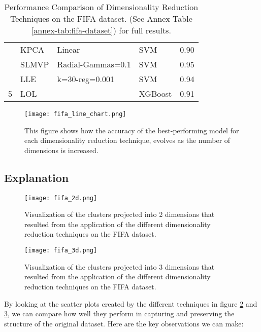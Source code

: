 \begin{table}[!ht]
\begin{tabular}{llllr}
        \rowcolor{lightgray}\multirow{-3}{*}{4} & KPCA           & Linear             & SVM           & 0.90     \\
                                                & SLMVP          & Radial-Gammas=0.1  & SVM           & 0.95     \\
                                                & LLE            & k=30-reg=0.001     & SVM           & 0.94     \\
        \multirow{-3}{*}{5}                     & LOL            &                    & XGBoost       & 0.91     \\
        \bottomrule
    \end{tabular}
    \caption{Performance Comparison of Dimensionality Reduction Techniques on the FIFA dataset. (See Annex Table \ref{annex-tab:fifa-dataset}) for full results.}
    \label{tab:fifa-dataset}
\end{table}

\begin{figure}[!ht]
    \centering
    \texttt{[image: fifa\_line\_chart.png]}
    \caption{This figure shows how the accuracy of the best-performing model for each dimensionality reduction technique, evolves as the number of dimensions is increased.}
    \label{fig:fifa_line_chart}
\end{figure}

\subsection{Explanation}

\begin{figure}[!ht]
    \centering
    \texttt{[image: fifa\_2d.png]}
    \caption{Visualization of the clusters projected into 2 dimensions that resulted from the application of the different dimensionality reduction techniques on the FIFA dataset.}
    \label{fig:fifa_2d}
\end{figure}

\begin{figure}[!ht]
    \centering
    \texttt{[image: fifa\_3d.png]}
    \caption{Visualization of the clusters projected into 3 dimensions that resulted from the application of the different dimensionality reduction techniques on the FIFA dataset.}
    \label{fig:fifa_3d}
\end{figure}

By looking at the scatter plots created by the different techniques in figure \ref{fig:fifa_2d} and \ref{fig:fifa_3d}, we can compare how well they perform in capturing and preserving the structure of the original dataset. Here are the key observations we can make:


